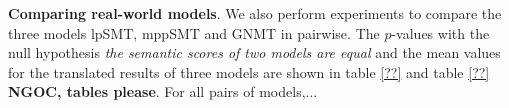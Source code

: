 \textbf{Comparing real-world models}. We also perform experiments to compare the three models 
lpSMT, mppSMT and GNMT in pairwise. The $p$-values with the null hypothesis \textit{the semantic 
scores of two models are equal} and the mean values for the translated results of three models 
are shown in table \ref{??}  and table \ref{??} \textbf{NGOC, tables please}. For all pairs of models,...


